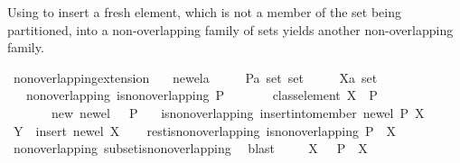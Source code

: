 \begin{isabellebody}
\begin{isamarkuptext}
Using  to insert a fresh element, which is not a member of the
  set  being partitioned, into a non-overlapping family of sets yields another
  non-overlapping family.%
\end{isamarkuptext}%
\isamarkuptrue%
\isamarkupfalse%
\ non{\isacharunderscore}overlapping{\isacharunderscore}extension{}{\isacharcolon}\isanewline
\ \ \ new{\isacharunderscore}el{\isacharcolon}{\isacharcolon}{\isacharprime}a\isanewline
\ \ \ \ \ P{\isacharcolon}{\isacharcolon}{\isachardoublequoteopen}{\isacharprime}a\ set\ set{\isachardoublequoteclose}\isanewline
\ \ \ \ \ X{\isacharcolon}{\isacharcolon}{\isachardoublequoteopen}{\isacharprime}a\ set{\isachardoublequoteclose}\isanewline
\ \ \ non{\isacharunderscore}overlapping{\isacharcolon}\ {\isachardoublequoteopen}is{\isacharunderscore}non{\isacharunderscore}overlapping\ P{\isachardoublequoteclose}\isanewline
\ \ \ \ \ \ \ class{\isacharunderscore}element{\isacharcolon}\ {\isachardoublequoteopen}X\ {\isasymin}\ P{\isachardoublequoteclose}\isanewline
\ \ \ \ \ \ \ new{\isacharcolon}\ {\isachardoublequoteopen}new{\isacharunderscore}el\ {\isasymnotin}\ {\isasymUnion}\ P{\isachardoublequoteclose}\isanewline
\ \ \ {\isachardoublequoteopen}is{\isacharunderscore}non{\isacharunderscore}overlapping\ {\isacharparenleft}insert{\isacharunderscore}into{\isacharunderscore}member\ new{\isacharunderscore}el\ P\ X{\isacharparenright}{\isachardoublequoteclose}\isanewline
%
\isadelimproof
%
\endisadelimproof
%
\isatagproof
{}\isamarkupfalse%
\ {\isacharminus}\isanewline
\ \ \isamarkupfalse%
\ {\isacharquery}Y\ {\isacharequal}\ {\isachardoublequoteopen}insert\ new{\isacharunderscore}el\ X{\isachardoublequoteclose}\isanewline
\ \ \isamarkupfalse%
\ rest{\isacharunderscore}is{\isacharunderscore}non{\isacharunderscore}overlapping{\isacharcolon}\ {\isachardoublequoteopen}is{\isacharunderscore}non{\isacharunderscore}overlapping\ {\isacharparenleft}P\ {\isacharminus}\ {\isacharbraceleft}X{\isacharbraceright}{\isacharparenright}{\isachardoublequoteclose}\isanewline
\ \ \ \ \isamarkupfalse%
\ non{\isacharunderscore}overlapping\ subset{\isacharunderscore}is{\isacharunderscore}non{\isacharunderscore}overlapping\ \isamarkupfalse%
\ blast\isanewline
\ \ \isamarkupfalse%
\ {\isacharasterisk}{\isacharcolon}\ {\isachardoublequoteopen}X\ {\isasyminter}\ {\isasymUnion}\ {\isacharparenleft}P\ {\isacharminus}\ {\isacharbraceleft}X{\isacharbraceright}{\isacharparenright}\ {\isacharequal}\ {\isacharbraceleft}{\isacharbraceright}{\isachardoublequoteclose}\isanewline

\end{isabellebody}
